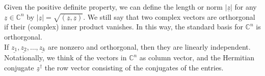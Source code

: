 Given the positive definite property, we can define the length or norm $|\underline{z}|$ for any $\underline{z}\in\mathbb C^n$ by $|\underline{z}|=\sqrt{(\underline{z},\underline{z})}$.
We still say that two complex vectors are orthorgonal if their (complex) inner product vanishes.
In this way, the standard basis for $\mathbb C^n$ is orthorgonal.\\
If $\underline{z_1},\underline{z_2},\ldots,\underline{z_k}$ are nonzero and orthorgonal, then they are linearly independent.\\
Notationally, we think of the vectors in $\mathbb C^n$ as column vector, and the Hermitian conjugate $\underline{z}^{\dagger}$ the row vector consisting of the conjugates of the entries.